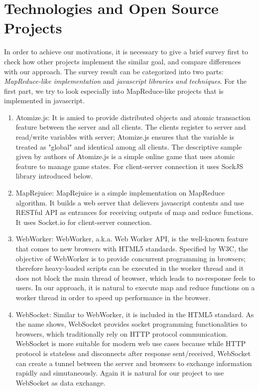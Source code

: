 \section{Technologies and Open Source Projects}

In order to achieve our motivations, it is necessary to give a brief survey first to check how other projects implement the similar goal, and compare differences with our approach.
The survey result can be categorized into two parts: \emph{MapReduce-like implementation} and \emph{javascript libraries and techniques}. For the first part, we try to look especially into MapReduce-like projects that is implemented in javascript.

\begin{enumerate}
%

\item Atomize.js\cite{atomizejs}:
  It is amied to provide distributed objects and atomic transaction feature between the server and all clients. The clients register to server and read/write variables with server; Atomize.js ensures that the variable is treated as "global" and identical among all clients. The descriptive sample given by authors of Atomize.js is a simple online game that uses atomic feature to manage game states. For client-server connection it uses SockJS library introduced below.

\item MapRejuice\cite{maprejuice}:
  MapRejuice is a simple implementation on MapReduce algorithm. It builds a web server that delievers javascript contents and use RESTful API as entrances for receiving outputs of map and reduce functions.
  It uses Socket.io for client-server connection.

\item WebWorker\cite{webworker}:
  WebWorker, a.k.a. Web Worker API, is the well-known feature that comes to new browsers with HTML5 standards. Specified by W3C, the objective of WebWorker is to provide concurrent programming in browsers; therefore heavy-loaded scripts can be executed in the worker thread and it does not block the main thread of browser, which leads to no-response feels to users.
  In our approach, it is natural to execute map and reduce functions on a worker thread in order to speed up performance in the browser.

\item WebSocket\cite{websocket}:
  Similar to WebWorker, it is included in the HTML5 standard. As the name shows, WebSocket provides socket programming functionalities to browsers, which traditionally rely on HTTP protocol communication.
  WebSocket is more suitable for modern web use cases because while HTTP protocol is stateless and disconnects after response sent/received, WebSocket can create a tunnel between the server and browsers to exchange information rapidly and simutaneously.
  Again it is natural for our project to use WebSocket as data exchange.


\end{enumerate}
